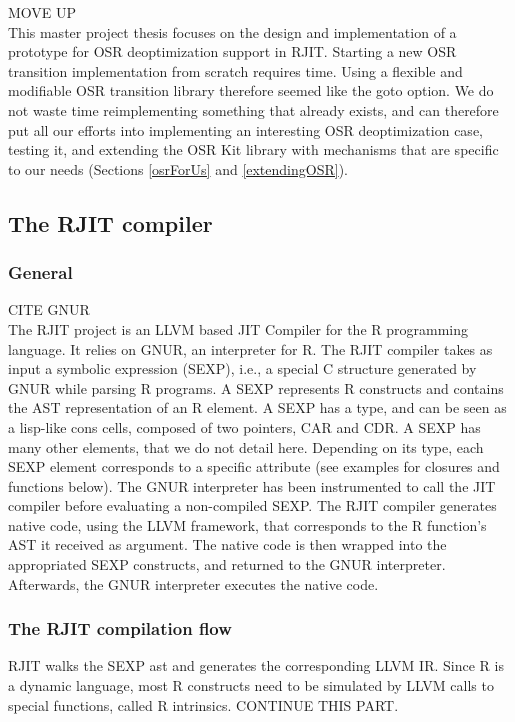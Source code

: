 MOVE UP\\

This master project thesis focuses on the design and implementation of a prototype for OSR deoptimization support in RJIT.
Starting a new OSR transition implementation from scratch requires time.
Using a flexible and modifiable OSR transition library therefore seemed like the goto option.
We do not waste time reimplementing something that already exists, and can therefore put all our efforts into implementing an interesting OSR deoptimization case, testing it, and extending the OSR Kit library with mechanisms that are specific to our needs (Sections \ref{osrForUs} and \ref{extendingOSR}).\\
\subsection{The RJIT compiler}
\subsubsection{General}
CITE GNUR\\
The RJIT project is an LLVM based JIT Compiler for the R programming language.
It relies on GNUR, an interpreter for R. 
The RJIT compiler takes as input a symbolic expression (SEXP), i.e., a special C structure generated by GNUR while parsing R programs.
A SEXP represents R constructs and contains the AST representation of an R element.
A SEXP has a type, and can be seen as a lisp-like cons cells, composed of two pointers, CAR and CDR.
A SEXP has many other elements, that we do not detail here.
Depending on its type, each SEXP element corresponds to a specific attribute (see examples for closures and functions below). 
The GNUR interpreter has been instrumented to call the JIT compiler before evaluating a non-compiled SEXP. 
The RJIT compiler generates native code, using the LLVM framework, that corresponds to the R function's AST it received as argument.
The native code is then wrapped into the appropriated SEXP constructs, and returned to the GNUR interpreter.
Afterwards, the GNUR interpreter executes the native code.\\ 

\subsubsection{The RJIT compilation flow}
RJIT walks the SEXP ast and generates the corresponding LLVM IR.
Since R is a dynamic language, most R constructs need to be simulated by LLVM calls to special functions, called R intrinsics.
CONTINUE THIS PART.\\

